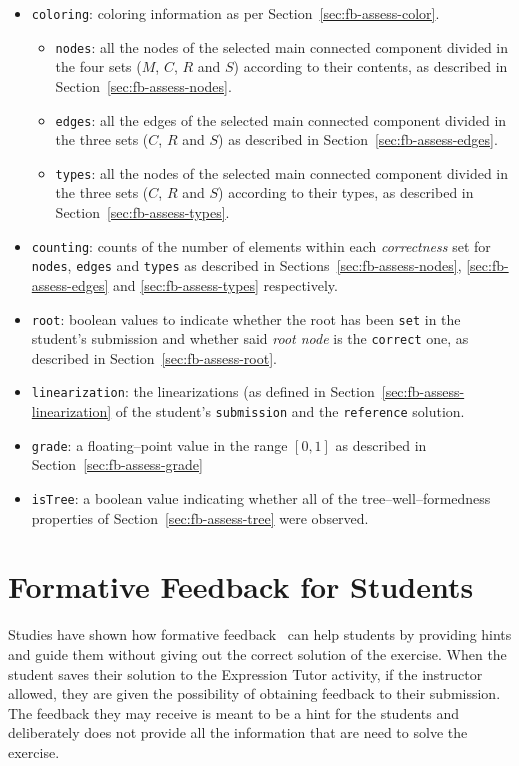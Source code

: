 \begin{chapterBody}
\begin{itemize}
    \item \texttt{coloring}: coloring information as per
Section~\ref{sec:fb-assess-color}.
    \begin{itemize}
        \item \texttt{nodes}: all the nodes of the selected main connected
component divided in the four sets ($M$, $C$, $R$ and $S$) according to their
contents, as described in Section~\ref{sec:fb-assess-nodes}.
        \item \texttt{edges}: all the edges of the selected main connected
component divided in the three sets ($C$, $R$ and $S$) as described in
Section~\ref{sec:fb-assess-edges}.
        \item \texttt{types}: all the nodes of the selected main connected
component divided in the three sets ($C$, $R$ and $S$) according to their
types, as described in Section~\ref{sec:fb-assess-types}.
    \end{itemize}
    \item \texttt{counting}: counts of the number of elements within each
\textit{correctness} set for \texttt{nodes}, \texttt{edges} and \texttt{types}
as described in Sections~\ref{sec:fb-assess-nodes}, \ref{sec:fb-assess-edges}
and \ref{sec:fb-assess-types} respectively.
    \item \texttt{root}: boolean values to indicate whether the root has been
\texttt{set} in the student's submission and whether said \textit{root node}
is the \texttt{correct} one, as described in Section~\ref{sec:fb-assess-root}.
    \item \texttt{linearization}: the linearizations (as defined in
Section~\ref{sec:fb-assess-linearization} of the student's \texttt{submission}
and the \texttt{reference} solution.
    \item \texttt{grade}: a floating–point value in the range
$ \left[0, 1\right]$ as described in Section~\ref{sec:fb-assess-grade}
    \item \texttt{isTree}: a boolean value indicating whether all of the
tree–well–formedness properties of Section~\ref{sec:fb-assess-tree} were
observed.
\end{itemize}

\section{Formative Feedback for Students}\label{sec:fb-ff}

Studies have shown how formative feedback~\cite{shute_focus_2008} can help
students by providing hints and guide them without giving out the correct 
solution of the exercise. When the student saves their solution to the
Expression Tutor activity, if the instructor allowed, they are given the
possibility of obtaining feedback to their submission. The feedback they may
receive is meant to be a hint for the students and deliberately does not provide
all the information that are need to solve the exercise.


\end{chapterBody}
